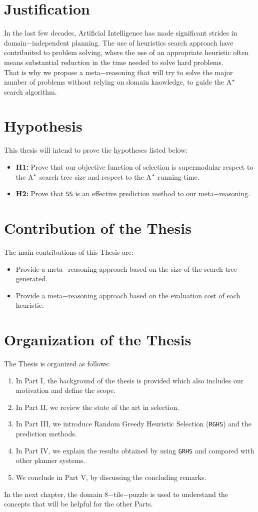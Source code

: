 \section{Justification}
\noindent
In the last few decades, Artificial Intelligence has made significant strides in domain$-$independent planning. The use of heuristics search approach have contribuited to problem solving, where the use of an appropriate heuristic often means substantial reduction in the time needed to solve hard problems.\\

That is why we propose a meta$-$reasoning that will try to solve the major number of problems without relying on domain knowledge, to guide the A$\sp{*}$ search algorithm.

\section{Hypothesis}
\noindent
This thesis will intend to prove the hypotheses listed below:
\begin{itemize}
\item \textbf{H1:} Prove that our objective function of selection is supermodular respect to the A$\sp{*}$ search tree size and respect to the A$\sp{*}$ running time.

\item \textbf{H2:} Prove that \texttt{SS} is an effective prediction method to our meta$-$reasoning.
\end{itemize}

\section{Contribution of the Thesis}
\noindent
The main contributions of this Thesis are:
\begin{itemize}
\item Provide a meta$-$reasoning approach based on the size of the search tree generated.
\item Provide a meta$-$reasoning approach based on the evaluation cost of each heuristic. 
\end{itemize}

\section{Organization of the Thesis}
\noindent
The Thesis is organized as follows: 
\begin{enumerate}
\item In Part I, the background of the thesis is provided which also includes our motivation and define the scope. 
\item In Part II, we review the state of the art in selection.
\item In Part III, we introduce Random Greedy Heuristic Selection (\texttt{RGHS}) and the prediction methods. 
\item In Part IV, we explain the results obtained by using \texttt{GRHS} and compared with other planner systems. 
\item We conclude in Part V, by discussing the concluding remarks.
\end{enumerate}

In the next chapter, the domain 8$-$tile$-$puzzle is used to understand the concepts that will be helpful for the other Parts. \\

\clearpage